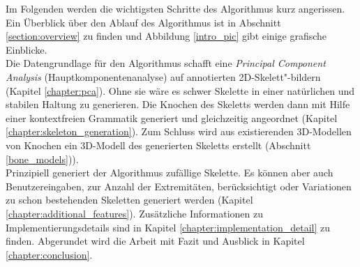 Im Folgenden werden die wichtigsten Schritte des Algorithmus kurz angerissen. Ein Überblick über den Ablauf des Algorithmus ist in Abschnitt \ref{section:overview} zu finden und Abbildung \ref{intro_pic} gibt einige grafische Einblicke.\\
Die Datengrundlage für den Algorithmus schafft eine \emph{Principal Component Analysis} (Hauptkomponentenanalyse) auf annotierten 2D-Skelett"-bildern (Kapitel \ref{chapter:pca}). Ohne sie wäre es schwer Skelette in einer natürlichen und stabilen Haltung zu generieren.
Die Knochen des Skeletts werden dann mit Hilfe einer kontextfreien Grammatik generiert und gleichzeitig angeordnet (Kapitel \ref{chapter:skeleton_generation}). 
Zum Schluss wird aus existierenden 3D-Modellen von Knochen ein 3D-Modell des generierten Skeletts erstellt (Abschnitt \ref{bone_models})).\\
Prinzipiell generiert der Algorithmus zufällige Skelette. Es können aber auch Benutzereingaben, \zb zur Anzahl der Extremitäten, berücksichtigt oder Variationen zu schon bestehenden Skeletten generiert werden (Kapitel \ref{chapter:additional_features}).
Zusätzliche Informationen zu Implementierungsdetails sind in Kapitel \ref{chapter:implementation_detail} zu finden. Abgerundet wird die Arbeit mit Fazit und Ausblick in Kapitel \ref{chapter:conclusion}.


